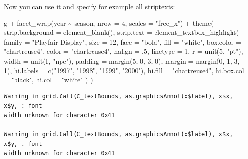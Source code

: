 \documentclass[
  letterpaper,
  DIV=11,
  numbers=noendperiod]{scrreprt}
\newenvironment{Shaded}{\begin{snugshade}}{\end{snugshade}}
\newcommand{\AttributeTok}[1]{\textcolor[rgb]{0.40,0.45,0.13}{#1}}
\newcommand{\DecValTok}[1]{\textcolor[rgb]{0.68,0.00,0.00}{#1}}
\newcommand{\FunctionTok}[1]{\textcolor[rgb]{0.28,0.35,0.67}{#1}}
\newcommand{\NormalTok}[1]{\textcolor[rgb]{0.00,0.23,0.31}{#1}}
\newcommand{\SpecialCharTok}[1]{\textcolor[rgb]{0.37,0.37,0.37}{#1}}
\newcommand{\StringTok}[1]{\textcolor[rgb]{0.13,0.47,0.30}{#1}}
\begin{document}
Now you can use it and specify for example all striptexts:

\begin{Shaded}
\begin{Highlighting}[]
\NormalTok{g }\SpecialCharTok{+} \FunctionTok{facet\_wrap}\NormalTok{(year }\SpecialCharTok{\textasciitilde{}}\NormalTok{ season, }\AttributeTok{nrow =} \DecValTok{4}\NormalTok{, }\AttributeTok{scales =} \StringTok{"free\_x"}\NormalTok{) }\SpecialCharTok{+}
  \FunctionTok{theme}\NormalTok{(}
    \AttributeTok{strip.background =} \FunctionTok{element\_blank}\NormalTok{(),}
    \AttributeTok{strip.text =} \FunctionTok{element\_textbox\_highlight}\NormalTok{(}
      \AttributeTok{family =} \StringTok{"Playfair Display"}\NormalTok{, }\AttributeTok{size =} \DecValTok{12}\NormalTok{, }\AttributeTok{face =} \StringTok{"bold"}\NormalTok{,}
      \AttributeTok{fill =} \StringTok{"white"}\NormalTok{, }\AttributeTok{box.color =} \StringTok{"chartreuse4"}\NormalTok{, }\AttributeTok{color =} \StringTok{"chartreuse4"}\NormalTok{,}
      \AttributeTok{halign =}\NormalTok{ .}\DecValTok{5}\NormalTok{, }\AttributeTok{linetype =} \DecValTok{1}\NormalTok{, }\AttributeTok{r =} \FunctionTok{unit}\NormalTok{(}\DecValTok{5}\NormalTok{, }\StringTok{"pt"}\NormalTok{), }\AttributeTok{width =} \FunctionTok{unit}\NormalTok{(}\DecValTok{1}\NormalTok{, }\StringTok{"npc"}\NormalTok{),}
      \AttributeTok{padding =} \FunctionTok{margin}\NormalTok{(}\DecValTok{5}\NormalTok{, }\DecValTok{0}\NormalTok{, }\DecValTok{3}\NormalTok{, }\DecValTok{0}\NormalTok{), }\AttributeTok{margin =} \FunctionTok{margin}\NormalTok{(}\DecValTok{0}\NormalTok{, }\DecValTok{1}\NormalTok{, }\DecValTok{3}\NormalTok{, }\DecValTok{1}\NormalTok{),}
      \AttributeTok{hi.labels =} \FunctionTok{c}\NormalTok{(}\StringTok{"1997"}\NormalTok{, }\StringTok{"1998"}\NormalTok{, }\StringTok{"1999"}\NormalTok{, }\StringTok{"2000"}\NormalTok{),}
      \AttributeTok{hi.fill =} \StringTok{"chartreuse4"}\NormalTok{, }\AttributeTok{hi.box.col =} \StringTok{"black"}\NormalTok{, }\AttributeTok{hi.col =} \StringTok{"white"}
\NormalTok{    )}
\NormalTok{  )}
\end{Highlighting}
\end{Shaded}

\begin{verbatim}
Warning in grid.Call(C_textBounds, as.graphicsAnnot(x$label), x$x, x$y, : font
width unknown for character 0x41

Warning in grid.Call(C_textBounds, as.graphicsAnnot(x$label), x$x, x$y, : font
width unknown for character 0x41
\end{verbatim}
\end{document}
